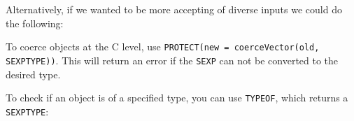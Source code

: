 \begin{Shaded}
\begin{Highlighting}[]
\StringTok{ }\NormalTok{(}\NormalTok{(} \NormalTok{, } \NormalTok{), }

\NormalTok{)}
\StringTok{ }
  \NormalTok{(}
  \NormalTok{(}\StringTok{ }\NormalTok{, }\StringTok{ }\NormalTok{)}
\NormalTok{\}}
\end{Highlighting}
\end{Shaded}

Alternatively, if we wanted to be more accepting of diverse inputs we
could do the following:

\begin{Shaded}
\begin{Highlighting}[]
\StringTok{ }
  \StringTok{ }
  \StringTok{ }

  \StringTok{ }\NormalTok{) }\NormalTok{(}\NormalTok{)}
  \StringTok{ }\NormalTok{) }\NormalTok{(}\NormalTok{)}
  
\NormalTok{\}}
\end{Highlighting}
\end{Shaded}

To coerce objects at the C level, use
\texttt{PROTECT(new = coerceVector(old, SEXPTYPE))}. This will return an
error if the \texttt{SEXP} can not be converted to the desired type.

To check if an object is of a specified type, you can use
\texttt{TYPEOF}, which returns a \texttt{SEXPTYPE}:


